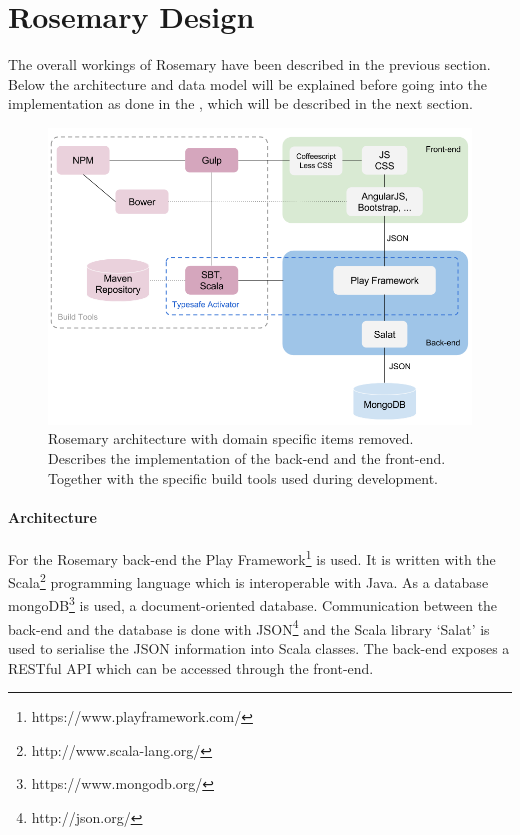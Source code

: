 \section{Rosemary Design}
\label{reuse-rosemary}

The overall workings of Rosemary have been described in the previous section.
Below the architecture and data model will be explained before going into the implementation as done in the \ivfsystem{}, which will be described in the next section.

\begin{figure}[!hb]
	\centering
	\includegraphics[width=1.0\linewidth]{images/rosemary-architecture}
	\caption{
		Rosemary architecture with domain specific items removed.
		Describes the implementation of the back-end and the front-end.
		Together with the specific build tools used during development.
	}
	\label{fig:reuse-rosemary-architecture}
\end{figure}

\paragraph{Architecture}
For the Rosemary back-end the Play Framework\footnote{https://www.playframework.com/} is used.
It is written with the Scala\footnote{http://www.scala-lang.org/} programming language which is interoperable with Java.
As a database mongoDB\footnote{https://www.mongodb.org/} is used, a document-oriented database.
Communication between the back-end and the database is done with JSON\footnote{http://json.org/} and the Scala library `Salat' is used to serialise the JSON information into Scala classes.
The back-end exposes a RESTful API which can be accessed through the front-end.


